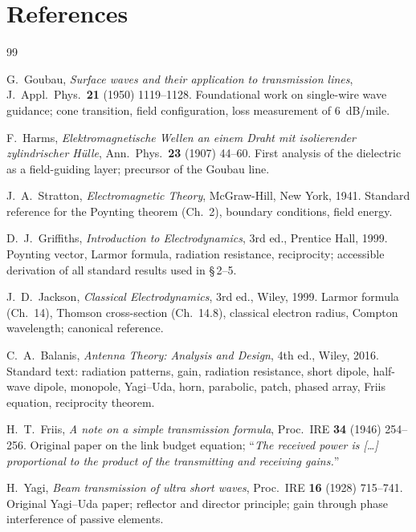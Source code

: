 \section*{References}

\begin{thebibliography}{99}


G.~Goubau,
\textit{Surface waves and their application to transmission lines},
J.~Appl.~Phys.\ \textbf{21} (1950) 1119--1128.
Foundational work on single-wire wave guidance; cone transition,
field configuration, loss measurement of 6~dB/mile.

F.~Harms,
\textit{Elektromagnetische Wellen an einem Draht mit isolierender
zylindrischer H\"ulle},
Ann.~Phys.\ \textbf{23} (1907) 44--60.
First analysis of the dielectric as a field-guiding layer; precursor
of the Goubau line.

J.~A.~Stratton,
\textit{Electromagnetic Theory},
McGraw-Hill, New York, 1941.
Standard reference for the Poynting theorem (Ch.~2), boundary conditions,
field energy.

D.~J.~Griffiths,
\textit{Introduction to Electrodynamics},
3rd ed., Prentice Hall, 1999.
Poynting vector, Larmor formula, radiation resistance, reciprocity;
accessible derivation of all standard results used in \S\,2--5.

J.~D.~Jackson,
\textit{Classical Electrodynamics},
3rd ed., Wiley, 1999.
Larmor formula (Ch.~14), Thomson cross-section (Ch.~14.8), classical
electron radius, Compton wavelength; canonical reference.

C.~A.~Balanis,
\textit{Antenna Theory: Analysis and Design},
4th ed., Wiley, 2016.
Standard text: radiation patterns, gain, radiation resistance, short dipole,
half-wave dipole, monopole, Yagi--Uda, horn, parabolic, patch, phased array,
Friis equation, reciprocity theorem.

H.~T.~Friis,
\textit{A note on a simple transmission formula},
Proc.~IRE \textbf{34} (1946) 254--256.
Original paper on the link budget equation;
``\textit{The received power is [\ldots] proportional to the product of the
transmitting and receiving gains.}''

H.~Yagi,
\textit{Beam transmission of ultra short waves},
Proc.~IRE \textbf{16} (1928) 715--741.
Original Yagi--Uda paper; reflector and director principle;
gain through phase interference of passive elements.


\end{thebibliography}
